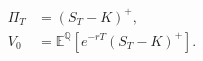\documentclass{equation-sheet}
\begin{document}
\begin{equation*}
\begin{aligned}
\Pi_T &= (S_T-K)^{+}, \\[0.75em]
V_0 &= \mathbb{E}^{\mathbb{Q}}\!\left[
  e^{-rT}(S_T-K)^{+}
\right].
\end{aligned}
\end{equation*}
\end{document}
